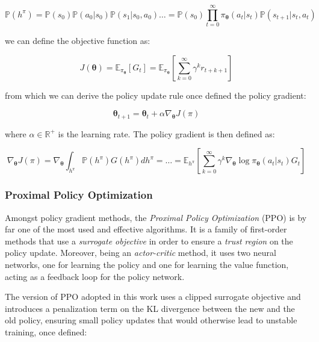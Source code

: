 \begin{equation}
    \mathbb{P}(h ^{\pi}) = \mathbb{P}(s _0) \mathbb{P}(a _0 | s _0) \mathbb{P}(s _1 | s _0, a _0) \dots = \mathbb{P}(s _0) \prod ^{\infty} _{t = 0} \pi _{\boldsymbol{\theta}} (a _t | s _t) \mathbb{P}(s _{t+1} | s _t, a _t)
\end{equation}

we can define the objective function as:

\begin{equation}
    J(\boldsymbol{\theta}) = \mathbb{E} _{\pi _{\boldsymbol{\theta}}} \left[ G _t \right] = \mathbb{E} _{\pi _{\boldsymbol{\theta}}} \left[ \sum ^{\infty} _{k = 0} \gamma ^k r _{t+k+1} \right]
\end{equation}

from which we can derive the policy update rule once defined the policy gradient:

\begin{equation}
    \boldsymbol{\theta} _{t+1} = \boldsymbol{\theta} _t + \alpha \nabla _{\boldsymbol{\theta}} J(\pi)
\end{equation}

where $\alpha \in \mathbb{R} ^+$ is the learning rate. The policy gradient is then defined as:

\begin{equation}
    \nabla _{\boldsymbol{\theta}} J(\pi) = \nabla _{\boldsymbol{\theta}} \int _{h ^{\pi}} \mathbb{P}(h ^{\pi})G(h ^{\pi})dh ^{\pi} = \dots = \mathbb{E} _{h^{\pi}} \left[ \sum ^{\infty} _{k = 0} \gamma ^k \nabla _{\boldsymbol{\theta}} \log \pi _{\boldsymbol{\theta}} (a _t | s _t) G _t \right]
\end{equation}

\subsubsection{Proximal Policy Optimization}

Amongst policy gradient methods, the \textit{Proximal Policy Optimization} (\ac{PPO}) is by far one of the most used and effective algorithms. It is a family of first-order methods that use a \textit{surrogate objective} in order to ensure a \textit{trust region} on the policy update.
Moreover, being an \textit{actor-critic} method, it uses two neural networks, one for learning the policy and one for learning the value function, acting as a feedback loop for the policy network.

The version of \ac{PPO} adopted in this work uses a clipped surrogate objective and introduces a penalization term on the \ac{KL} divergence between the new and the old policy, ensuring small policy updates that would otherwise lead to unstable training, once defined:

